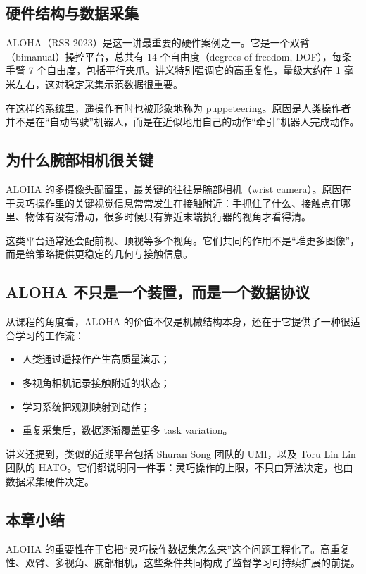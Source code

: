 \documentclass[a4paper]{article}
\begin{document}
\subsection{硬件结构与数据采集}

ALOHA（RSS 2023）是这一讲最重要的硬件案例之一。它是一个双臂（bimanual）操控平台，总共有 14 个自由度（degrees of freedom, DOF），每条手臂 7 个自由度，包括平行夹爪。讲义特别强调它的高重复性，量级大约在 1 毫米左右，这对稳定采集示范数据很重要。

在这样的系统里，遥操作有时也被形象地称为 puppeteering。原因是人类操作者并不是在“自动驾驶”机器人，而是在近似地用自己的动作“牵引”机器人完成动作。

\subsection{为什么腕部相机很关键}

ALOHA 的多摄像头配置里，最关键的往往是腕部相机（wrist camera）。原因在于灵巧操作里的关键视觉信息常常发生在接触附近：手抓住了什么、接触点在哪里、物体有没有滑动，很多时候只有靠近末端执行器的视角才看得清。

这类平台通常还会配前视、顶视等多个视角。它们共同的作用不是“堆更多图像”，而是给策略提供更稳定的几何与接触信息。

\subsection{ALOHA 不只是一个装置，而是一个数据协议}

从课程的角度看，ALOHA 的价值不仅是机械结构本身，还在于它提供了一种很适合学习的工作流：
\begin{itemize}
  \item 人类通过遥操作产生高质量演示；
  \item 多视角相机记录接触附近的状态；
  \item 学习系统把观测映射到动作；
  \item 重复采集后，数据逐渐覆盖更多 task variation。
\end{itemize}

讲义还提到，类似的近期平台包括 Shuran Song 团队的 UMI，以及 Toru Lin Lin 团队的 HATO。它们都说明同一件事：灵巧操作的上限，不只由算法决定，也由数据采集硬件决定。

\subsection{本章小结}

ALOHA 的重要性在于它把“灵巧操作数据集怎么来”这个问题工程化了。高重复性、双臂、多视角、腕部相机，这些条件共同构成了监督学习可持续扩展的前提。
\end{document}
